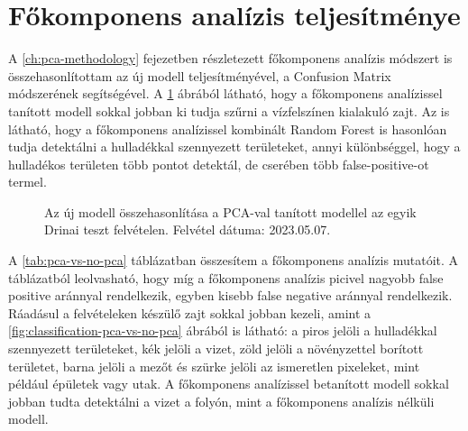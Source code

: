 \section{Főkomponens analízis teljesítménye}
\label{ch:pca-performance}

A \ref{ch:pca-methodology} fejezetben részletezett főkomponens analízis módszert is összehasonlítottam az új modell teljesítményével, a Confusion Matrix módszerének segítségével. A \ref{fig:pca-vs-no-pca} ábrából látható, hogy a főkomponens analízissel tanított modell sokkal jobban ki tudja szűrni a vízfelszínen kialakuló zajt. Az is látható, hogy a főkomponens analízissel kombinált Random Forest is hasonlóan tudja detektálni a hulladékkal szennyezett területeket, annyi különbséggel, hogy a hulladékos területen több pontot detektál, de cserében több false-positive-ot termel.

\begin{figure}[H]
	\centering
	\hspace{5pt}
	\hspace{5pt}
	\caption{Az új modell összehasonlítása a PCA-val tanított modellel az egyik Drinai teszt felvételen. Felvétel dátuma: 2023.05.07.}
	\label{fig:pca-vs-no-pca}
\end{figure}

A \ref{tab:pca-vs-no-pca} táblázatban összesítem a főkomponens analízis mutatóit. A táblázatból leolvasható, hogy míg a főkomponens analízis picivel nagyobb false positive aránnyal rendelkezik, egyben kisebb false negative aránnyal rendelkezik. Ráadásul a felvételeken készülő zajt sokkal jobban kezeli, amint a \ref{fig:classification-pca-vs-no-pca} ábrából is látható: a piros jelöli a hulladékkal szennyezett területeket, kék jelöli a vizet, zöld jelöli a növényzettel borított területet, barna jelöli a mezőt és szürke jelöli az ismeretlen pixeleket, mint például épületek vagy utak. A főkomponens analízissel betanított modell sokkal jobban tudta detektálni a vizet a folyón, mint a főkomponens analízis nélküli modell.

